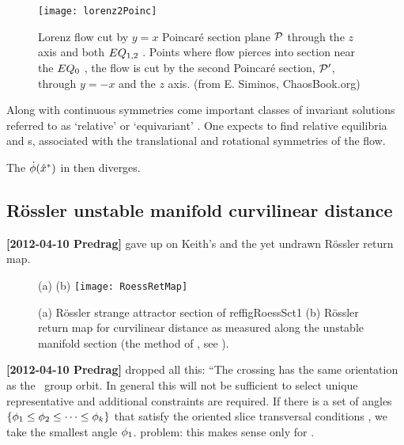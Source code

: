 \begin{figure}
   \centering
\texttt{[image: lorenz2Poinc]}
   \caption{
Lorenz flow cut by  $y=x$ Poincar\'e section plane ${\cal P}$ through the
$z$ axis and both $EQ_{1,2}$ \eqva. Points where flow pierces into
section %
near the $EQ_{0}$ \eqv, the flow is cut by the second Poincar\'e
section,  ${\cal P}'$, through $y=-x$ and the $z$ axis.
\hfill (from E. Siminos, ChaosBook.org)
} \label{fig:LorenzSect}
\end{figure}


Along with continuous symmetries come important classes of invariant
solutions referred to as `relative' or `equivariant'
. One expects to find relative
equilibria and \rpo s, associated with the translational
and rotational symmetries of the flow.

The {\phaseVel}
$\dot{{\bf \phi}}(\hat{x}^\ast)$ in  then diverges.

\subsection{R\"ossler unstable manifold curvilinear distance}

{\bf [2012-04-10 Predrag]} gave up on Keith's 
and the yet undrawn {R\"ossler return map}.

\begin{figure}
\begin{center}
(a) %
(b) \texttt{[image: RoessRetMap]}
\end{center}
  \caption{
(a) R\"ossler strange attractor section of  reffig{RoessSct1}
(b) R\"ossler return map for curvilinear distance as measured
along the unstable manifold section (the method of
, see ).
  }
\label{fig:RoessRetMap}
\end{figure}

{\bf [2012-04-10 Predrag]}  dropped all this: ``The crossing has the same orientation as
    the \template\ group orbit.
    In general this will not be sufficient to select unique representative
    and additional constraints are required. If there is a set of angles
    $\{{\bf \phi}_1\leq{\bf \phi}_2\leq\cdots\leq{\bf \phi}_k \}$ that satisfy the
    oriented slice transversal conditions ,
    we take the smallest angle ${\bf \phi}_1$.
    problem: this makes sense only for .

